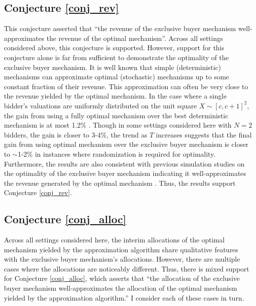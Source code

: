 \documentclass{article}
\begin{document}
\subsection{Conjecture \ref{conj_rev}}

This conjecture asserted that ``the revenue of the exclusive buyer mechanism well-approximates the revenue of the optimal mechanism''. Across all settings considered above, this conjecture is supported. However, support for this conjecture alone is far from sufficient to demonstrate the optimality of the exclusive buyer mechanism. It is well known that simple (deterministic) mechanisms can approximate optimal (stochastic) mechanisms up to some constant fraction of their revenue. This approximation can often be very close to the revenue yielded by the optimal mechanism. In the case where a single bidder's valuations are uniformly distributed on the unit square $X \sim [c,c+1]^2$, the gain from using a fully optimal mechanism over the best deterministic mechanism is at most 1.2\% \autocite[p11]{pavlov2011optimal}. Though in some settings considered here with $N=2$ bidders, the gain is closer to 3-4\%, the trend as $T$ increases suggests that the final gain from using optimal mechanism over the exclusive buyer mechanism is closer to $\sim$1-2\% in instances where randomization is required for optimality. Furthermore, the results are also consistent with previous simulation studies on the optimality of the exclusive buyer mechanism indicating it well-approximates the revenue generated by the optimal mechanism \autocite{belloni2010multidimensional}. Thus, the results support Conjecture \ref{conj_rev}.

\subsection{Conjecture \ref{conj_alloc}}

Across all settings considered here, the interim allocations of the optimal mechanism yielded by the approximation algorithm share qualitative features with the exclusive buyer mechanism's allocations. However, there are multiple cases where the allocations are noticeably different. Thus, there is mixed support for Conjecture \ref{conj_alloc}, which asserts that ``the allocation of the exclusive buyer mechanism well-approximates the allocation of the optimal mechanism yielded by the approximation algorithm.'' I consider each of these cases in turn.
\end{document}
